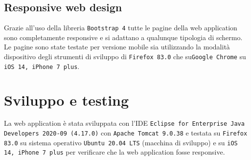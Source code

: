 \documentclass{article}
\begin{document}
\subsection{Responsive web design}
Grazie all'uso della libreria \texttt{Bootstrap 4} tutte le pagine della web application sono completamente responsive e si adattano a qualunque tipologia di schermo. Le pagine sono state testate per versione mobile sia utilizzando la modalità dispositivo degli strumenti di sviluppo di \texttt{Firefox 83.0} che su\texttt{Google Chrome} su \texttt{iOS 14, iPhone 7 plus}.
\section{Sviluppo e testing}
La web application è stata sviluppata con l'IDE \texttt{Eclipse for Enterprise Java Developers 2020-09 (4.17.0)} con \texttt{Apache Tomcat 9.0.38} e testata su \texttt{Firefox 83.0} su sistema operativo \texttt{Ubuntu 20.04 LTS} (macchina di sviluppo) e su \texttt{iOS 14, iPhone 7 plus} per verificare che la web application fosse responsive.
\end{document}
